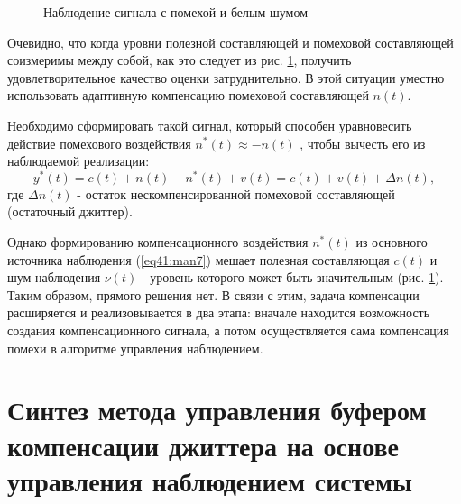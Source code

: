 \begin{figure}[!h]

\centering
{} 
\caption{Наблюдение сигнала с помехой и белым шумом}
\label{fig:man_1}
\end{figure}


Очевидно, что когда уровни полезной составляющей и помеховой составляющей соизмеримы между собой, как это следует из рис. \ref{fig:man_1}, получить удовлетворительное качество оценки затруднительно. 
В этой ситуации уместно использовать адаптивную компенсацию помеховой составляющей $n(t)$.

Необходимо сформировать такой сигнал, который способен уравновесить действие помехового воздействия $n^*(t)\approx-n(t)$ \cite{popovski}, чтобы вычесть его из наблюдаемой реализации:
\begin{equation}\label{eq41:man8}
y^*(t)=c(t)+n(t)-n^*(t)+v(t)=c(t)+v(t)+\Delta n(t),
\end{equation}
\noindent где $\Delta n(t)$ - остаток нескомпенсированной помеховой составляющей (остаточный джиттер).

Однако формированию компенсационного воздействия $n^*(t)$ из основного источника наблюдения (\ref{eq41:man7}) мешает полезная составляющая $c(t)$ и шум наблюдения $\nu (t)$ - уровень которого может быть значительным (рис. \ref{fig:man_1}).
Таким образом, прямого решения нет.
В связи с этим, задача компенсации расширяется и реализовывается в два этапа: вначале находится возможность создания компенсационного сигнала, а потом осуществляется сама компенсация помехи в алгоритме управления наблюдением.


\section{Синтез метода управления буфером компенсации джиттера на основе управления наблюдением системы}

